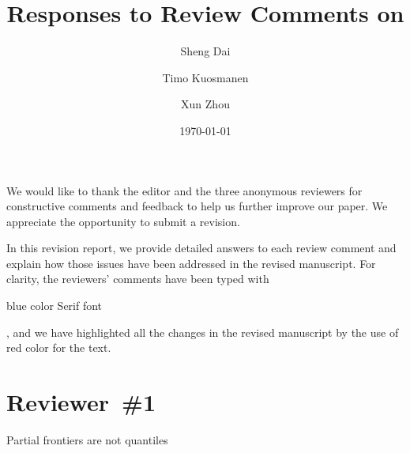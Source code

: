 \documentclass[12pt]{article}
\title{Responses to Review Comments on \PaperTitle{Partial frontiers are not quantiles} \meta{EJOR-D-22-01411}\\
  \vspace{0.5em} \large 
  }
\author{Sheng Dai \and Timo Kuosmanen \and Xun Zhou}
\date{\today}
\newcommand{\np}{\vskip 0.3cm}
\begin{document}


\baselineskip 20pt

We would like to thank the editor and the three anonymous reviewers for constructive comments and feedback to help us further improve our paper. We appreciate the opportunity to submit a revision. \np

In this revision report, we provide detailed answers to each review comment and explain how those issues have been addressed in the revised manuscript. For clarity, the reviewers' comments have been typed with {\blueb \begin{sf}blue color Serif font\end{sf}}, and we have highlighted all the changes in the revised manuscript by the use of {\color{red}red color} for the text. \np


\newpage
\section*{Reviewer~\#1}

\begin{sf}

{\blueb Partial frontiers are not quantiles}
\end{sf}
\begin{response}


\end{response}


 \np
 \np
 \np

\end{document}
